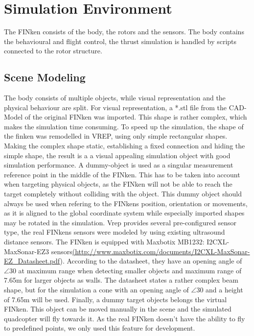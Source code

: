 \label{sec:implementation}

\section{Simulation Environment}

The FINken consists of the body, the rotors and the sensors. The body contains the behavioural and flight control, the thrust simulation is handled by scripts connected to the rotor structure.

\subsection{Scene Modeling}

The body consists of multiple objects, while visual representation and the physical behaviour are split. For visual representation, a *.stl file from the CAD-Model of the original FINken was imported. This shape is rather complex, which makes the simulation time consuming. To speed up the simulation, the shape of the finken was remodelled in VREP, using only simple rectangular shapes. Making the complex shape static, establishing a fixed connection and hiding the simple shape, the result is a a visual appealing simulation object with good simulation performance. A dummy-object is used as a singular measurement reference point in the middle of the FINken. This has to be taken into account when targeting physical objects, as the FINken will not be able to reach the target completely without colliding with the object. This dummy object should always be used when refering to the FINkens position, orientation or movements, as it is aligned to the global coordinate system while especially imported shapes may be rotated in the simulation. Vrep provides several pre-configured sensor type, the real FINkens sensors were modeled by using existing ultrasound distance sensors. The FINken is equipped with Maxbotix MB1232: I2CXL-MaxSonar-EZ3 sensors\url{(http://www.maxbotix.com/documents/I2CXL-MaxSonar-EZ_Datasheet.pdf}). According to the datasheet, they have an opening angle of $\angle{30}$ at maximum range when detecting smaller objects and maximum range of 7.65m for larger objects as walls. The datasheet states a rather complex beam shape, but for the simulation a cone with an opening angle of $\angle{30}$  and a height of 7.65m will be used. Finally, a dummy target objects belongs the virtual FINken. This object can be moved manually in the scene and the simulated quadcopter will fly towards it.  As the real FINken doesn't have the ability to fly to predefined points, we only used this feature for development.

